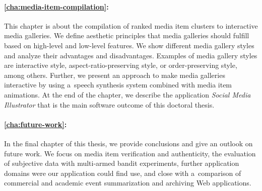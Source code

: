 \paragraph{\autoref{cha:media-item-compilation}:}

This chapter is about the compilation of ranked media item clusters
to interactive media galleries.
We define aesthetic principles that media galleries should fulfill
based on high-level and low-level features.
We show different media gallery styles and analyze their
advantages and disadvantages.
Examples of media gallery styles are interactive style, aspect-ratio-preserving style, or order-preserving style, among others.
Further, we present an approach to make media galleries interactive
by using a~speech synthesis system combined with media item animations.
At the end of the chapter, we describe the application
\emph{Social Media Illustrator} that is
the main software outcome of this doctoral thesis.

\paragraph{\autoref{cha:future-work}:}

In the final chapter of this thesis,
we provide conclusions and give an outlook on future work.
We focus on media item verification and authenticity,
the evaluation of subjective data with multi-armed bandit experiments,
further application domains were our application could find use,
and close with a~comparison of commercial and academic event summarization
and archiving Web applications.

\clearpage
\printbibliography[heading=subbibliography]